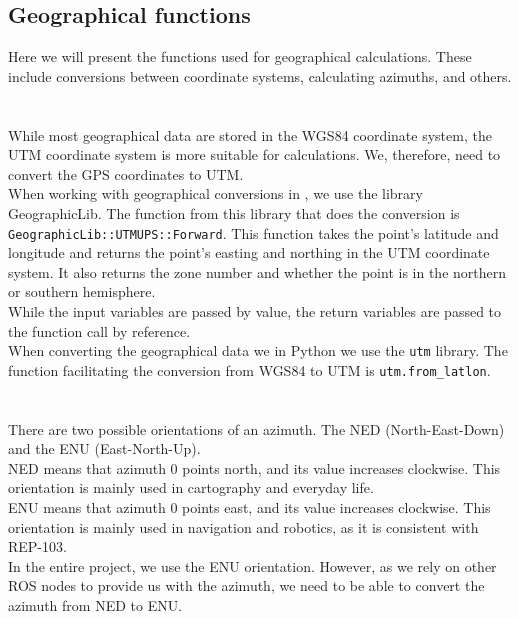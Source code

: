     \subsection{Geographical functions}
    \label{sec:geo_func}
        Here we will present the functions used for geographical calculations. These include conversions between coordinate systems, calculating azimuths, and others.\\\\
        \\
            While most geographical data are stored in the WGS84 coordinate system, the UTM coordinate system is more suitable for calculations. We, therefore, need to convert the GPS coordinates to UTM.\\
            When working with geographical conversions in \CC, we use the library GeographicLib. The function from this library that does the conversion is \texttt{GeographicLib::UTMUPS::Forward}. This function takes the point's latitude and longitude and returns the point's easting and northing in the UTM coordinate system. It also returns the zone number and whether the point is in the northern or southern hemisphere.\\
            While the input variables are passed by value, the return variables are passed to the function call by reference.\\
            When converting the geographical data we in Python we use the \texttt{utm} library. The function facilitating the conversion from WGS84 to UTM is \texttt{utm.from\_latlon}.\\\\
        \\
            There are two possible orientations of an azimuth. The NED (North-East-Down) and the ENU (East-North-Up).\\
            NED means that azimuth 0 points north, and its value increases clockwise. This orientation is mainly used in cartography and everyday life.\\
            ENU means that azimuth 0 points east, and its value increases clockwise. This orientation is mainly used in navigation and robotics, as it is consistent with REP-103\cite{REP-103}.\\
            In the entire project, we use the ENU orientation. However, as we rely on other ROS nodes to provide us with the azimuth, we need to be able to convert the azimuth from NED to ENU.\\

